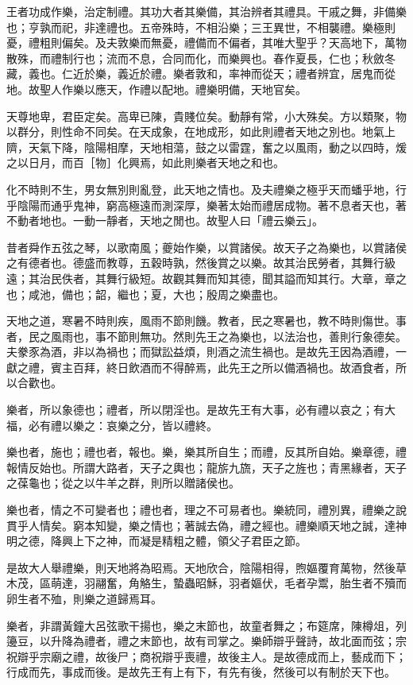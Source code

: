 \begin{pinyinscope}
王者功成作樂，治定制禮。其功大者其樂備，其治辨者其禮具。干戚之舞，非備樂也；亨孰而祀，非達禮也。五帝殊時，不相沿樂；三王異世，不相襲禮。樂極則憂，禮粗則偏矣。及夫敦樂而無憂，禮備而不偏者，其唯大聖乎？天高地下，萬物散殊，而禮制行也；流而不息，合同而化，而樂興也。春作夏長，仁也；秋斂冬藏，義也。仁近於樂，義近於禮。樂者敦和，率神而從天；禮者辨宜，居鬼而從地。故聖人作樂以應天，作禮以配地。禮樂明備，天地官矣。

天尊地卑，君臣定矣。高卑已陳，貴賤位矣。動靜有常，小大殊矣。方以類聚，物以群分，則性命不同矣。在天成象，在地成形，如此則禮者天地之別也。地氣上隮，天氣下降，陰陽相摩，天地相蕩，鼓之以雷霆，奮之以風雨，動之以四時，煖之以日月，而百［物］化興焉，如此則樂者天地之和也。

化不時則不生，男女無別則亂登，此天地之情也。及夫禮樂之極乎天而蟠乎地，行乎陰陽而通乎鬼神，窮高極遠而測深厚，樂著太始而禮居成物。著不息者天也，著不動者地也。一動一靜者，天地之閒也。故聖人曰「禮云樂云」。

昔者舜作五弦之琴，以歌南風；夔始作樂，以賞諸侯。故天子之為樂也，以賞諸侯之有德者也。德盛而教尊，五穀時孰，然後賞之以樂。故其治民勞者，其舞行級遠；其治民佚者，其舞行級短。故觀其舞而知其德，聞其謚而知其行。大章，章之也；咸池，備也；韶，繼也；夏，大也；殷周之樂盡也。

天地之道，寒暑不時則疾，風雨不節則饑。教者，民之寒暑也，教不時則傷世。事者，民之風雨也，事不節則無功。然則先王之為樂也，以法治也，善則行象德矣。夫豢豕為酒，非以為禍也；而獄訟益煩，則酒之流生禍也。是故先王因為酒禮，一獻之禮，賓主百拜，終日飲酒而不得醉焉，此先王之所以備酒禍也。故酒食者，所以合歡也。

樂者，所以象德也；禮者，所以閉淫也。是故先王有大事，必有禮以哀之；有大福，必有禮以樂之：哀樂之分，皆以禮終。

樂也者，施也；禮也者，報也。樂，樂其所自生；而禮，反其所自始。樂章德，禮報情反始也。所謂大路者，天子之輿也；龍旂九旒，天子之旌也；青黑緣者，天子之葆龜也；從之以牛羊之群，則所以贈諸侯也。

樂也者，情之不可變者也；禮也者，理之不可易者也。樂統同，禮別異，禮樂之說貫乎人情矣。窮本知變，樂之情也；著誠去偽，禮之經也。禮樂順天地之誠，達神明之德，降興上下之神，而凝是精粗之體，領父子君臣之節。

是故大人舉禮樂，則天地將為昭焉。天地欣合，陰陽相得，煦嫗覆育萬物，然後草木茂，區萌達，羽翮奮，角觡生，蟄蟲昭穌，羽者嫗伏，毛者孕鬻，胎生者不殰而卵生者不殈，則樂之道歸焉耳。

樂者，非謂黃鐘大呂弦歌干揚也，樂之末節也，故童者舞之；布筵席，陳樽俎，列籩豆，以升降為禮者，禮之末節也，故有司掌之。樂師辯乎聲詩，故北面而弦；宗祝辯乎宗廟之禮，故後尸；商祝辯乎喪禮，故後主人。是故德成而上，藝成而下；行成而先，事成而後。是故先王有上有下，有先有後，然後可以有制於天下也。


\end{pinyinscope}
